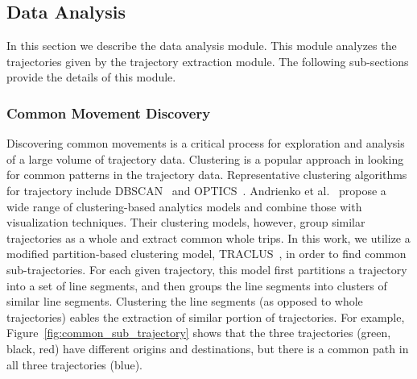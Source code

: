 \subsection{Data Analysis}
\label{sec:analysis_models}
In this section we describe the data analysis module.
This module analyzes the trajectories given by the trajectory extraction module.
The following sub-sections provide the details of this module.

\subsubsection{Common Movement Discovery}
\label{sec:common_movement_discovery}
Discovering common movements is a critical process for exploration and analysis of a large volume of trajectory data.
Clustering is a popular approach in looking for common patterns in the trajectory data.
Representative clustering algorithms for trajectory include DBSCAN~\cite{Ester:1996:Density} and OPTICS~\cite{Ankerst:1999:Optics}.
Andrienko et al.~\cite{Andrienko:2013:Visual} propose a wide range of clustering-based analytics models and combine those with visualization techniques.
Their clustering models, however, group similar trajectories as a whole and extract common whole trips.
In this work, we utilize a modified partition-based clustering model, TRACLUS~\cite{Lee:2007:Trajectory}, in order to find common sub-trajectories.
For each given trajectory, this model first partitions a trajectory into a set of line segments, and then groups the line segments into clusters of similar line segments.
Clustering the line segments (as opposed to whole trajectories) eables the extraction of similar portion of trajectories.
For example, Figure~\ref{fig:common_sub_trajectory} shows that the three trajectories (green, black, red) have different origins and destinations, but there is a common path in all three trajectories (blue).
%

